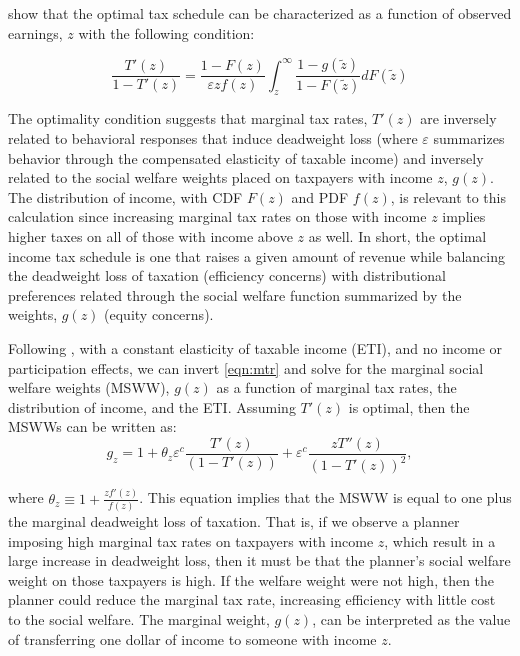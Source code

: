 \documentclass[12pt]{article}
\begin{document}
\cite{AS2015} show that the optimal tax schedule can be characterized as a function of observed earnings, $z$ with the following condition:

\begin{equation}
\label{eqn:mtr}
  \frac{T'(z)}{1 - T'(z)} = \frac{1-F(z)}{\varepsilon z f(z)}\int_{z}^{\infty}\frac{1-g(\tilde{z})}{1-F(\tilde{z})}dF(\tilde{z})
\end{equation}

The optimality condition suggests that marginal tax rates, $T'(z)$ are inversely related to behavioral responses that induce deadweight loss (where $\varepsilon$ summarizes behavior through the compensated elasticity of taxable income) and inversely related to the social welfare weights placed on taxpayers with income $z$, $g(z)$.  The distribution of income, with CDF $F(z)$ and PDF $f(z)$, is relevant to this calculation since increasing marginal tax rates on those with income $z$ implies higher taxes on all of those with income above $z$ as well.  In short, the optimal income tax schedule is one that raises a given amount of revenue while balancing the deadweight loss of taxation (efficiency concerns) with distributional preferences related through the social welfare function summarized by the weights, $g(z)$ (equity concerns).

Following \citet{JJZ2017}, with a constant elasticity of taxable income (ETI), and no income or participation effects, we can invert \ref{eqn:mtr} and solve for the marginal social welfare weights (MSWW), $g(z)$ as a function of marginal tax rates, the distribution of income, and the ETI.  Assuming $T'(z)$ is optimal, then the MSWWs can be written as:
\begin{equation}
\label{eqn:g_z}
    g_z = 1 + \theta_z \varepsilon^c \frac{T'(z)}{(1-T'(z))} + \varepsilon^c \frac{zT''(z)}{(1-T'(z))^2},
\end{equation}

where $\theta_z \equiv 1 + \frac{zf'(z)}{f(z)}$.  This equation implies that the MSWW is equal to one plus the marginal deadweight loss of taxation.  That is, if we observe a planner imposing high marginal tax rates on taxpayers with income $z$, which result in a large increase in deadweight loss, then it must be that the planner's social welfare weight on those taxpayers is high. If the welfare weight were not high, then the planner could reduce the marginal tax rate, increasing efficiency with little cost to the social welfare. The marginal weight, $g(z)$, can be interpreted as the value of transferring one dollar of income to someone with income $z$.
\end{document}
